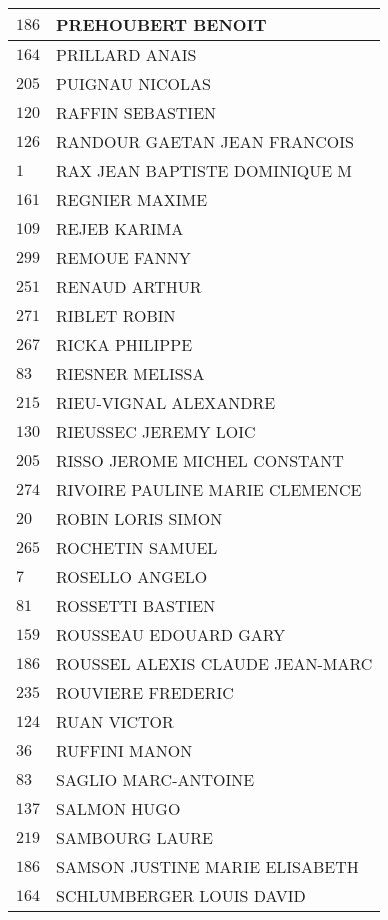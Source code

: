 \begin{xltabular}{\linewidth}{|l|X|}
    \hline
    $186$ & PREHOUBERT BENOIT \\
    \hline
    $164$ & PRILLARD ANAIS \\
    \hline
    $205$ & PUIGNAU NICOLAS \\
    \hline
    $120$ & RAFFIN SEBASTIEN \\
    \hline
    $126$ & RANDOUR GAETAN JEAN FRANCOIS \\
    \hline
    $1$ & RAX JEAN BAPTISTE DOMINIQUE M \\
    \hline
    $161$ & REGNIER MAXIME \\
    \hline
    $109$ & REJEB KARIMA \\
    \hline
    $299$ & REMOUE FANNY \\
    \hline
    $251$ & RENAUD ARTHUR \\
    \hline
    $271$ & RIBLET ROBIN \\
    \hline
    $267$ & RICKA PHILIPPE \\
    \hline
    $83$ & RIESNER MELISSA \\
    \hline
    $215$ & RIEU-VIGNAL ALEXANDRE \\
    \hline
    $130$ & RIEUSSEC JEREMY LOIC \\
    \hline
    $205$ & RISSO JEROME MICHEL CONSTANT \\
    \hline
    $274$ & RIVOIRE PAULINE MARIE CLEMENCE \\
    \hline
    $20$ & ROBIN LORIS SIMON \\
    \hline
    $265$ & ROCHETIN SAMUEL \\
    \hline
    $7$ & ROSELLO ANGELO \\
    \hline
    $81$ & ROSSETTI BASTIEN \\
    \hline
    $159$ & ROUSSEAU EDOUARD GARY \\
    \hline
    $186$ & ROUSSEL ALEXIS CLAUDE JEAN-MARC \\
    \hline
    $235$ & ROUVIERE FREDERIC \\
    \hline
    $124$ & RUAN VICTOR \\
    \hline
    $36$ & RUFFINI MANON \\
    \hline
    $83$ & SAGLIO MARC-ANTOINE \\
    \hline
    $137$ & SALMON HUGO \\
    \hline
    $219$ & SAMBOURG LAURE \\
    \hline
    $186$ & SAMSON JUSTINE MARIE ELISABETH \\
    \hline
    $164$ & SCHLUMBERGER LOUIS DAVID \\

\end{xltabular}
